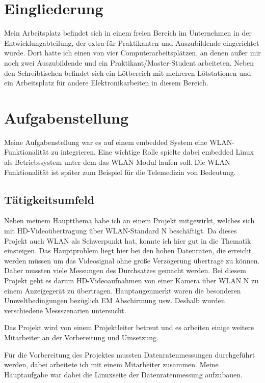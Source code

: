 \documentclass[pdftex,12pt,a4paper]{scrartcl}
\begin{document}
\section{Eingliederung}
Mein Arbeitsplatz befindet sich in einem freien Bereich im Unternehmen in der Entwicklungabteilung,
der extra für Praktikanten und Auszubildende eingerichtet wurde. Dort hatte ich einen von vier Computerarbeitsplätzen, an denen außer mir noch zwei Auszubildende und ein Praktikant/Master-Student arbeiteten.
Neben den Schreibtischen befindet sich ein Lötbereich mit mehreren Lötstationen und ein Arbeitsplatz für andere Elektronikarbeiten in diesem Bereich.
\section{Aufgabenstellung}
Meine Aufgabenstellung war es auf einem embedded System eine WLAN-Funktionalität zu integrieren.
Eine wichtige Rolle spielte dabei embedded Linux als Betriebssystem unter dem das WLAN-Modul laufen soll.
Die WLAN-Funktionalität ist später zum Beispiel für die Telemedizin von Bedeutung.
\subsection{Tätigkeitsumfeld}
Neben meinem Hauptthema habe ich an einem Projekt mitgewirkt, welches sich mit HD-Videoübertragung über WLAN-Standard N beschäftigt.
Da dieses Projekt auch WLAN als Schwerpunkt hat, konnte ich hier gut in die Thematik einsteigen.
Das Hauptproblem liegt hier bei den hohen Datenraten, die erreicht werden müssen um das Videosignal ohne große Verzögerung übertrage zu können. Daher mussten viele Messungen des Durchsatzes gemacht werden.
Bei diesem Projekt geht es darum HD-Videoaufnahmen von einer Kamera
über WLAN N zu einem Anzeigegerät zu übertragen. Hauptaugenmerkt waren
die besonderen Umweltbedingungen bezüglich EM Abschirmung usw. Deshalb wurden verschiedene Messszenarien untersucht.

Das Projekt wird von einem Projektleiter betreut und es arbeiten einige weitere Mitarbeiter an der Vorbereitung und Umsetzung.

Für die Vorbereitung des Projektes mussten Datenratenmessungen durchgeführt werden, dabei arbeitete ich mit einem Mitarbeiter zusammen.
Meine Hauptaufgabe war dabei die Linuxseite der Datenratenmessung aufzubauen.
\end{document}
